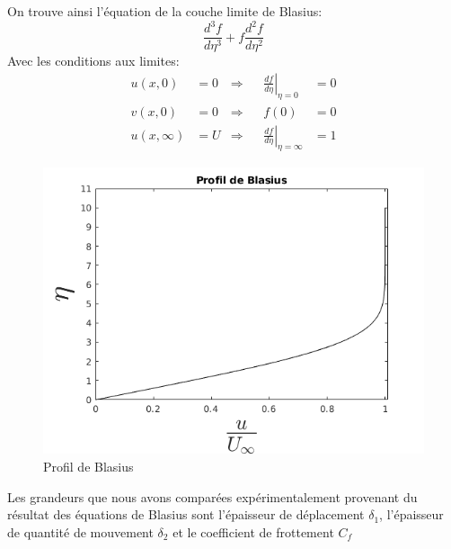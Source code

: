 \documentclass[french]{article}
\begin{document}
On trouve ainsi l'équation de la couche limite de Blasius:
\begin{equation}	
	\frac{d^{3}f}{d\eta^{3}} + f\frac{d^{2} f}{d\eta^{2}}
\end{equation}
Avec les conditions aux limites:
\begin{align}
	u(x,0) &= 0 &\Rightarrow &&
	\left.
	\frac{d f}{d \eta}     \right|_{\eta = 0} &= 0
	\\
	v(x,0) &= 0 &\Rightarrow &&
	f(0) &= 0
	\\
	u(x,\infty) &= U &\Rightarrow &&
	\left.
	\frac{d f}{d \eta} \right|_{\eta = \infty} &= 1
\end{align}
\newpage
\begin{figure}[ht]
	\centering
	\includegraphics[scale = 0.6]{./image/Blasius.png}
	\caption{Profil de Blasius}
\end{figure}
Les grandeurs que nous avons comparées expérimentalement provenant du résultat des équations de Blasius sont l'épaisseur de déplacement $\delta_{1}$, l'épaisseur de quantité de mouvement $\delta_{2}$ et le coefficient de frottement $C_{f}$
\end{document}

